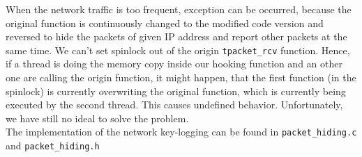 When the network traffic is too frequent, exception can be occurred, because the original
function is continuously changed to the modified code version and reversed 
to hide the packets of given IP address and report other packets at the
same time. We can't set spinlock out of the origin \texttt{tpacket\_rcv} function. Hence, if a thread is doing the memory copy inside our hooking function and an other one are calling the origin function, it might happen, that the first function (in the spinlock) is currently overwriting the original function, which is currently being executed by the second thread. This causes undefined behavior. 
Unfortunately, we have still no ideal to solve the problem.
\\
The implementation of the network key-logging can be found in 
\verb+packet_hiding.c+ and \verb+packet_hiding.h+\\ 

